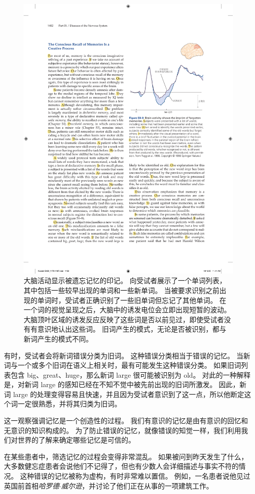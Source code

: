 \begin{figure}[htbp]
	\centering
	\includegraphics[width=0.67\linewidth]{chap59/fig_59_9}
	\caption{大脑活动显示被遗忘记忆的印记。
		向受试者展示了一个单词列表，其中包括一些较早出现的单词和一些新单词。
		当被要求识别之前出现的单词时，受试者正确识别了一些旧单词但忘记了其他单词。
		在一个词的视觉呈现之后，大脑中的诱发电位会立即出现短暂的波动。
		大脑顶叶区域的诱发反应反映了这些词是否以前见过，即使受试者没有有意识地认出这些词。
		旧词产生的模式，无论是否被识别，都与新词产生的模式不同\cite{rugg1998dissociation}。}
	\label{fig:59_9}
\end{figure}


有时，受试者会将新词错误分类为旧词。
这种错误分类相当于错误的记忆。
当新词与一个或多个旧词在语义上相关时，最有可能发生这种错误分类。
如果旧词列表包含 big、great、huge，那么新词 large 很可能被识别为 old。
对此的一种解释是，对新词 large 的感知已经在不知不觉中被先前出现的旧词所激发。
因此，新词 large 的处理变得容易且快速，并且因为受试者意识到了这一点，所以他断定这个词一定很熟悉，并将其归类为旧词。


这一观察强调记忆是一个创造性的过程。
我们有意识的记忆是由有意识的回忆和无意识的知识构成的。
为了防止错误的记忆，就像错误的知觉一样，我们利用我们对世界的了解来确定哪些记忆是可信的。


在某些患者中，筛选记忆的过程会变得非常混乱。
如果被问到昨天发生了什么，大多数健忘症患者会说他们不记得了，但也有少数人会详细描述与事实不符的情况。
这种错误的记忆被称为虚构，有时非常难以置信。
例如，一名患者说他见过英国前首相\textit{哈罗德$\cdot$威尔逊}，并讨论了他们正在从事的一项建筑工作。


